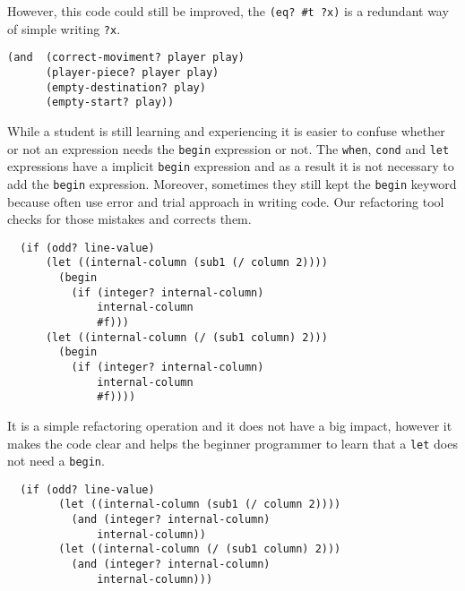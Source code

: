 However, this code could still be improved, the {\tt (eq? \#t ?x)} is a redundant way
of simple writing {\tt ?x}.
\begin{lstlisting}
(and  (correct-moviment? player play)
      (player-piece? player play)
      (empty-destination? play)
      (empty-start? play))
\end{lstlisting}


While a student is still learning and experiencing it is easier to confuse whether
or not an expression needs the {\tt begin} expression or not.
The {\tt when}, {\tt cond} and {\tt let} expressions have a implicit {\tt begin} expression and
as a result it is not necessary to add the {\tt begin} expression.
Moreover, sometimes they still kept the {\tt begin} keyword because often use error and trial approach
in writing code.
Our refactoring tool checks for those mistakes and corrects them.
\begin{lstlisting}
  (if (odd? line-value)
      (let ((internal-column (sub1 (/ column 2))))
        (begin
          (if (integer? internal-column)
              internal-column
              #f)))
      (let ((internal-column (/ (sub1 column) 2)))
        (begin
          (if (integer? internal-column)
              internal-column
              #f))))
\end{lstlisting}
It is a simple refactoring operation and it does not have a big impact, however
it makes the code clear and helps the beginner programmer to learn that a {\tt let}
does not need a {\tt begin}.
\begin{lstlisting}
  (if (odd? line-value)
        (let ((internal-column (sub1 (/ column 2))))
          (and (integer? internal-column)
              internal-column))
        (let ((internal-column (/ (sub1 column) 2)))
          (and (integer? internal-column)
              internal-column)))
\end{lstlisting}


